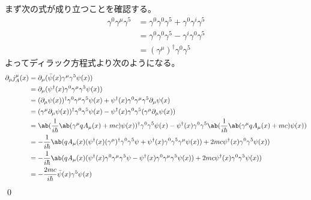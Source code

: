 \documentclass[uplatex,dvipdfmx,a4paper,11pt]{jlreq}
\makeatletter
\numberwithin{equation}{section}
\theoremstyle{definition}
\renewenvironment{proof}[1][\proofname]{\par
  \normalfont
  \topsep6\p@\@plus6\p@ \trivlist
  \item[\hskip\labelsep{\bfseries #1}\@addpunct{\bfseries}]\ignorespaces\quad\par
}{%
  \qed\endtrivlist\@endpefalse
}
\renewcommand\proofname{証明}
\makeatother
\begin{document}
\begin{proof}
  まず次の式が成り立つことを確認する。
  \begin{align}
    \gamma^0\gamma^\mu\gamma^5 & = \gamma^0\gamma^0\gamma^5 + \gamma^0\gamma^i\gamma^5 \\
                               & = \gamma^0\gamma^0\gamma^5 - \gamma^i\gamma^0\gamma^5 \\
                               & = (\gamma^\mu)^\dagger\gamma^0\gamma^5
  \end{align}
  よってディラック方程式より次のようになる。
  \begin{align}
    \partial_\mu j_A^\mu(x) & = \partial_\mu(\bar{\psi}(x)\gamma^\mu\gamma^5\psi(x))                                                                                                                                     \\
                            & = \partial_\mu(\psi^\dagger(x)\gamma^0\gamma^\mu\gamma^5\psi(x))                                                                                                                           \\
                            & = (\partial_\mu\psi(x))^\dagger\gamma^0\gamma^\mu\gamma^5\psi(x) + \psi^\dagger(x)\gamma^0\gamma^\mu\gamma^5\partial_\mu\psi(x)                                                            \\
                            & = (\gamma^\mu\partial_\mu\psi(x))^\dagger\gamma^0\gamma^5\psi(x) - \psi^\dagger(x)\gamma^0\gamma^5(\gamma^\mu\partial_\mu\psi(x))                                                          \\
                            & = \ab(\frac{1}{i\hbar}\ab(\gamma^\mu qA_\mu(x) + mc)\psi(x))^\dagger\gamma^0\gamma^5\psi(x) - \psi^\dagger(x)\gamma^0\gamma^5\ab(\frac{1}{i\hbar}\ab(\gamma^\mu qA_\mu(x) + mc)\psi(x))    \\
                            & = -\frac{1}{i\hbar}\ab(qA_\mu(x)(\psi^\dagger(x)(\gamma^\mu)^\dagger\gamma^0\gamma^5\psi + \psi^\dagger(x)\gamma^0\gamma^5\gamma^\mu \psi(x)) + 2mc\psi^\dagger(x)\gamma^0\gamma^5\psi(x)) \\
                            & = -\frac{1}{i\hbar}\ab(qA_\mu(x)(\psi^\dagger(x)\gamma^0\gamma^\mu\gamma^5\psi - \psi^\dagger(x)\gamma^0\gamma^\mu\gamma^5 \psi(x)) + 2mc\psi^\dagger(x)\gamma^0\gamma^5\psi(x))           \\
                            & = -\frac{2mc}{i\hbar}\bar{\psi}(x)\gamma^5\psi(x)
  \end{align}
\end{proof}
\end{document}
